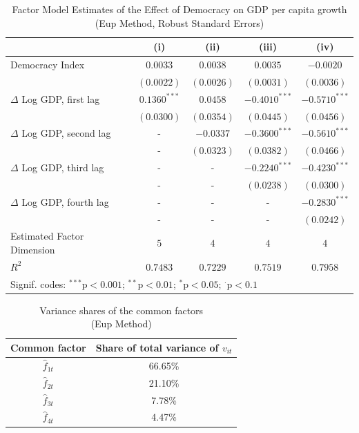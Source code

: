 \begin{table}[htb]
\centering
\captionsetup{justification=centering}
\caption{Factor Model Estimates of the Effect of Democracy on \ac{GDP} per capita growth \\
(\acs{Eup} Method, Robust Standard Errors)}\label{eup_results}
\begin{tabular}{lcccc}
\hline
                       & (i)       & (ii)       & (iii)       & (iv)      \\
\hline
Democracy Index                    & $0.0033$   & $0.0038$   & $0.0035$   & $-0.0020$   \\
                       & $(0.0022)$   & $(0.0026)$   & $(0.0031)$   & $(0.0036)$   \\
$\Delta$ Log GDP, first lag      & $0.1360^{***}$   & $0.0458$     & $-0.4010^{***}$    & $-0.5710^{***}$    \\
                       & $(0.0300)$   & $(0.0354)$   & $(0.0445)$   & $(0.0456)$   \\
$\Delta$ Log GDP, second lag     & -         & $-0.0337$    & $-0.3600^{***}$   & $-0.5610^{***}$    \\
                       & -         & $(0.0323)$   & $(0.0382)$   & $(0.0466)$   \\
$\Delta$ Log GDP, third lag     & -         & -          & $-0.2240^{***}$    & $-0.4230^{***}$    \\
                       & -         & -          & $(0.0238)$   & $(0.0300)$   \\
$\Delta$ Log GDP, fourth lag      & -         & -          & -          & $-0.2830^{***}$    \\
                       & -         & -          & -          & $(0.0242)$   \\
\hline
Estimated Factor Dimension    & $5$    & $4$    & $4$    & $4$    \\
$R^2$              & $0.7483$     & $0.7229$     & $0.7519$    & $0.7958$    \\
\hline
\multicolumn{5}{l}{Signif. codes: $^{***}$p$<0.001$; $^{**}$p$<0.01$; $^{*}$p$<0.05$; $^{\cdot}$p$<0.1$}\\
\end{tabular}
\end{table}


\begin{table}[hbt]
  \caption{Variance shares of the common factors \\
  (\ac{Eup} Method)}
  \centering
  \begin{tabular}{cc}
    \hline 
    Common factor & Share of total variance of \( v_{it} \) \\
    \hline 
    \( \hat{f}_{1t} \) & 66.65\% \\
    \( \hat{f}_{2t} \) & 21.10\% \\
    \( \hat{f}_{3t} \) & 7.78\% \\
    \( \hat{f}_{4t} \) & 4.47\% \\
    \hline
  \end{tabular}
  \label{tab:variance}
\end{table}


